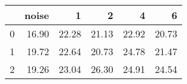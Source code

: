 \begin{tabular}{lrrrrr}
\toprule
{} &  noise &      1 &      2 &      4 &      6 \\
\midrule
0 &  16.90 &  22.28 &  21.13 &  22.92 &  20.73 \\
1 &  19.72 &  22.64 &  20.73 &  24.78 &  21.47 \\
2 &  19.26 &  23.04 &  26.30 &  24.91 &  24.54 \\
\bottomrule
\end{tabular}
